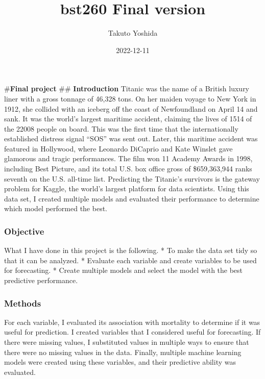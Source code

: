 \documentclass[
]{article}
\title{bst260 Final version}
\author{Takuto Yoshida}
\date{2022-12-11}
\begin{document}
\maketitle

\#\textbf{Final project} \#\# \textbf{Introduction} Titanic was the name
of a British luxury liner with a gross tonnage of 46,328 tons. On her
maiden voyage to New York in 1912, she collided with an iceberg off the
coast of Newfoundland on April 14 and sank. It was the world's largest
maritime accident, claiming the lives of 1514 of the 22008 people on
board. This was the first time that the internationally established
distress signal ``SOS'' was sent out. Later, this maritime accident was
featured in Hollywood, where Leonardo DiCaprio and Kate Winslet gave
glamorous and tragic performances. The film won 11 Academy Awards in
1998, including Best Picture, and its total U.S. box office gross of
\$659,363,944 ranks seventh on the U.S. all-time list. Predicting the
Titanic's survivors is the gateway problem for Kaggle, the world's
largest platform for data scientists. Using this data set, I created
multiple models and evaluated their performance to determine which model
performed the best.

\hypertarget{objective}{%
\subsubsection{\texorpdfstring{\textbf{Objective}}{Objective}}\label{objective}}

What I have done in this project is the following. * To make the data
set tidy so that it can be analyzed. * Evaluate each variable and create
variables to be used for forecasting. * Create multiple models and
select the model with the best predictive performance.

\hypertarget{methods}{%
\subsubsection{\texorpdfstring{\textbf{Methods}}{Methods}}\label{methods}}

For each variable, I evaluated its association with mortality to
determine if it was useful for prediction. I created variables that I
considered useful for forecasting. If there were missing values, I
substituted values in multiple ways to ensure that there were no missing
values in the data. Finally, multiple machine learning models were
created using these variables, and their predictive ability was
evaluated.
\end{document}
